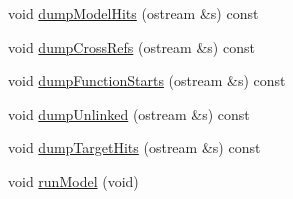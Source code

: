 \begin{DoxyCompactItemize}
\item 
void \mbox{\hyperlink{class_code_data_analysis_a6bbc01214c5235583b79a2e9f014bfbf}{dump\+Model\+Hits}} (ostream \&s) const
\item 
void \mbox{\hyperlink{class_code_data_analysis_a0bc5f3f9fe210f9602025884b41a39aa}{dump\+Cross\+Refs}} (ostream \&s) const
\item 
void \mbox{\hyperlink{class_code_data_analysis_a4929ff0dbefe9f019e29f675d2a8d16e}{dump\+Function\+Starts}} (ostream \&s) const
\item 
void \mbox{\hyperlink{class_code_data_analysis_a1817d772abce6c94e56ce48ba36b9058}{dump\+Unlinked}} (ostream \&s) const
\item 
void \mbox{\hyperlink{class_code_data_analysis_af1e3bf0ac6da27639cfcd8cb22f931d6}{dump\+Target\+Hits}} (ostream \&s) const
\item 
void \mbox{\hyperlink{class_code_data_analysis_af2376b45db9a51691d61a95d07220786}{run\+Model}} (void)
\end{DoxyCompactItemize}

